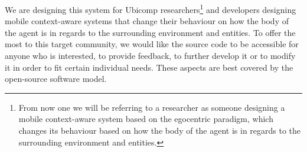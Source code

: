 We are designing this system for Ubicomp researchers\footnote{From now one we will be referring to a researcher as someone designing a mobile context-aware system based on the egocentric paradigm, which changes its behaviour based on how the body of the agent is in regards to the surrounding environment and entities.} and developers designing mobile context-aware systems that change their behaviour on how the body of the agent is in regards to the surrounding environment and entities. To offer the most to this target community, we would like the source code to be accessible for anyone who is interested, to provide feedback, to further develop it or to modify it in order to fit certain individual needs. These aspects are best covered by the open-source software model.\\









